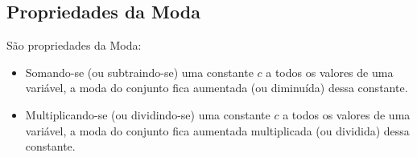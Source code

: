     \subsection{Propriedades da Moda}

São propriedades da Moda:
\begin{itemize}
    \item Somando-se (ou subtraindo-se) uma constante $c$ a todos os valores de uma variável, a moda do conjunto fica aumentada (ou diminuída) dessa constante.
    \item Multiplicando-se (ou dividindo-se) uma constante $c$ a todos os valores de uma variável, a moda do conjunto fica aumentada multiplicada (ou dividida) dessa constante.
\end{itemize}
